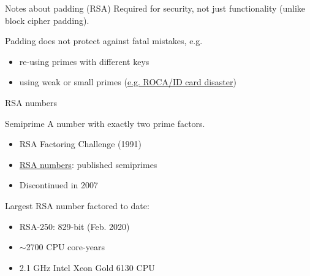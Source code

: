 \begin{frame}{Notes about padding (RSA)}
  Required for security, not just functionality (unlike block cipher padding).

  \vspace*{1em}

  \pause
  Padding does not protect against fatal mistakes, e.g.
  \begin{itemize}[<+(1)->]
    \item re-using primes with different keys
    \item using weak or small primes (\href{https://cybersec.ee/2017/10/18/rsa-2048-bit-keys-in-estonian-id-cards-issued-after-october-2014-are-factorizable/}{e.g. ROCA/ID card disaster})
  \end{itemize}
\end{frame}

\begin{frame}{RSA numbers}
  \pause
  \begin{block}{Semiprime}
    A number with exactly two prime factors.
  \end{block}
  
  \begin{itemize}[<+(1)->]
    \item RSA Factoring Challenge (1991)
    \item \href{https://en.wikipedia.org/wiki/RSA_numbers}{RSA numbers}: published semiprimes
    \item Discontinued in 2007
  \end{itemize}

  \pause
  Largest RSA number factored to date:
  \begin{itemize}[<+(1)->]
    \item RSA-250: 829-bit (Feb. 2020)
    \item $\sim$2700 CPU core-years
    \item 2.1 GHz Intel Xeon Gold 6130 CPU
  \end{itemize}
\end{frame}

